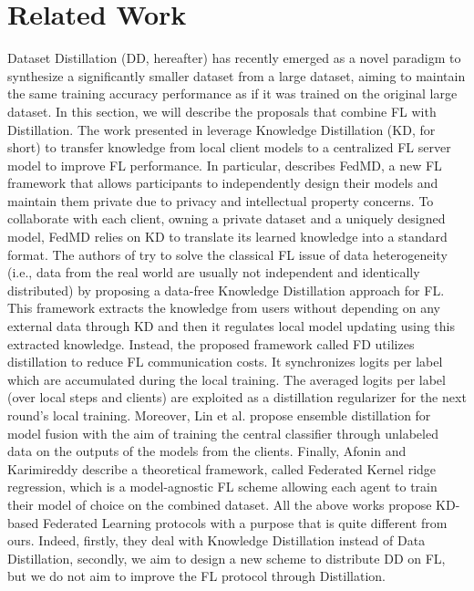 \section{Related Work}
\label{sec:related}

Dataset Distillation (DD, hereafter) \cite{wang2018dataset} has recently emerged as a novel paradigm to synthesize a significantly
smaller dataset from a large dataset, aiming to maintain the same training accuracy performance as if it was trained on the original large dataset. 
In this section, we will describe the proposals that combine FL with Distillation.
The work presented in \cite{li2019fedmd,zhu2021data,jeong2018communication,lin2020ensemble,afonin2021towards} leverage Knowledge Distillation (KD, for short) to transfer knowledge from local client models to a centralized FL server model to improve FL performance.
In particular, \cite{li2019fedmd} describes FedMD, a new FL framework that allows participants to independently design their models and maintain them private due to privacy and intellectual property concerns. To collaborate with each client, owning a private dataset and a uniquely designed model, FedMD relies on KD to translate its learned knowledge into a standard format.
The authors of \cite{zhu2021data} try to solve the classical FL issue of data heterogeneity (i.e., data from the real world are usually not independent and identically distributed) by proposing a data-free Knowledge Distillation approach for FL. This framework extracts the knowledge from users without depending on any external data through KD and then it regulates local model updating using this extracted knowledge.
Instead, the proposed framework called FD \cite{jeong2018communication} utilizes distillation to reduce FL communication costs. It synchronizes logits per label which are accumulated during the local training. The averaged
logits per label (over local steps and clients) are exploited as a distillation regularizer for the next round's local training. Moreover, Lin et al. \cite{lin2020ensemble} propose ensemble distillation for model fusion with the aim of training
the central classifier through unlabeled data on the outputs of the models from the clients. 
Finally, Afonin and Karimireddy \cite{afonin2021towards}
describe a theoretical framework, called Federated Kernel
ridge regression, which is a model-agnostic FL scheme allowing each agent to train
their model of choice on the combined dataset.
All the above works propose KD-based Federated Learning protocols with a purpose that is quite different from ours. Indeed, firstly, they deal with Knowledge Distillation instead of Data Distillation, secondly, we aim to design a new scheme to distribute DD on FL, but we do not aim to improve the FL protocol through Distillation.

